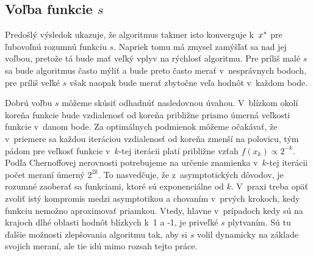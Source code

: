 \subsection{Voľba funkcie $s$}
Predošlý výsledok ukazuje, že algoritmus takmer isto konverguje k~$x^\ast$ pre
ľubovoľnú rozumnú funkciu $s$. Napriek tomu má zmysel zamýšľať sa nad jej
voľbou, pretože tá bude mať veľký vplyv na rýchlosť algoritmu. Pre príliš malé
$s$ sa bude algoritmus často mýliť a bude preto často merať v~nesprávnych
bodoch, pre príliš veľké $s$ však naopak bude merať zbytočne veľa hodnôt
v~každom bode.

Dobrú voľbu $s$ môžeme skúsiť odhadnúť nasledovnou úvahou. V~blízkom okolí
koreňa funkcie bude vzdialenosť od koreňa približne priamo úmerná veľkosti
funkcie v~danom bode. Za optimálnych podmienok môžeme očakávať, že v~priemere sa
každou iteráciou vzdialenosť od koreňa zmenší na polovicu, tým pádom pre veľkosť
funkcie v~$k$-tej iterácii platí približne vzťah $f(x_k) \propto 2^{-k}$.
Podľa Chernoffovej nerovnosti potrebujeme na určenie znamienka v~$k$-tej
iterácii počet meraní úmerný $2^{2k}$. To nasvedčuje, že z~asymptotických
dôvodov, je rozumné zaoberať sa funkciami, ktoré sú exponenciálne od $k$.
V~praxi treba opäť zvoliť istý kompromis medzi asymptotikou a chovaním v~prvých
krokoch, kedy funkciu nemožno aproximovať priamkou. Vtedy, hlavne v~prípadoch
kedy sú na krajoch dlhé oblasti hodnôt blízkych k~1 a -1, je priveľké $s$
plytvaním. Sú tu ďalšie možnosti zlepšovania algoritmu tak, aby si $s$ volil
dynamicky na základe svojich meraní, ale tie idú mimo rozsah tejto práce.
